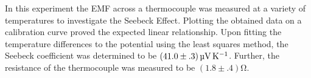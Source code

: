 
\physics

\begin{paperabs}
	
	In this experiment the EMF across a thermocouple was measured at a variety of temperatures to investigate the Seebeck Effect. Plotting the obtained data on a calibration curve proved the expected linear relationship. Upon fitting the temperature differences to the potential using the least squares method, the Seebeck coefficient was determined to be \( \left(41.0 \pm .3\right) \si{\micro\volt\per\kelvin} \). Further, the resistance of the thermocouple was measured to be $(1.8\pm.4)\si{\ohm}$.
	
\end{paperabs}

